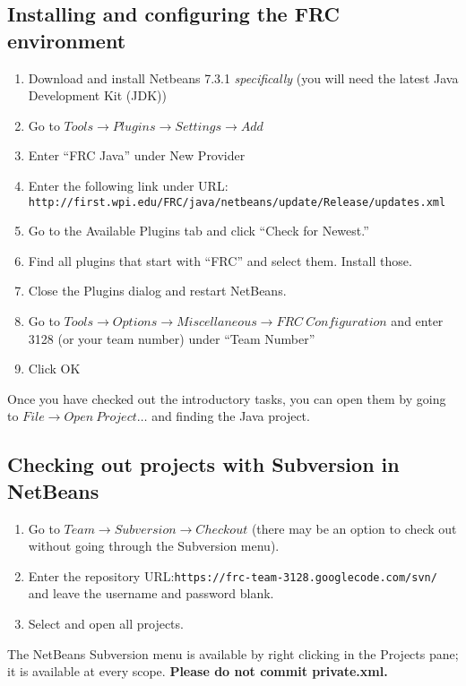 \documentclass[a4paper]{article}
\begin{document}
\subsection{Installing and configuring the FRC environment}
\begin{enumerate}
\item{Download and install Netbeans 7.3.1 \textit{specifically} (you will need the latest Java Development Kit (JDK))}
\item{Go to $Tools \rightarrow Plugins \rightarrow Settings \rightarrow Add$}
\item{Enter ``FRC Java'' under New Provider}
\item{Enter the following link under URL: \lstinline{http://first.wpi.edu/FRC/java/netbeans/update/Release/updates.xml}}
\item{Go to the Available Plugins tab and click ``Check for Newest.''}
\item{Find all plugins that start with ``FRC'' and select them. Install those.}
\item{Close the Plugins dialog and restart NetBeans.}
\item{Go to $Tools\rightarrow Options\rightarrow Miscellaneous\rightarrow FRC\ Configuration$ and enter 3128 (or your team number) under ``Team Number''}
\item{Click OK}
\end{enumerate}

Once you have checked out the introductory tasks, you can open them by going to $File\rightarrow Open\ Project\ldots$ and finding the Java project.

\subsection{Checking out projects with Subversion in NetBeans}
\begin{enumerate}
\item{Go to $Team\rightarrow Subversion\rightarrow Checkout$ (there may be an option to check out without going through the Subversion menu).}
\item{Enter the repository URL:\lstinline{https://frc-team-3128.googlecode.com/svn/} and leave the username and password blank.}
\item{Select and open all projects.}
\end{enumerate}

The NetBeans Subversion menu is available by right clicking in the Projects pane; it is available at every scope. \textbf{Please do not commit private.xml.}
\end{document}
